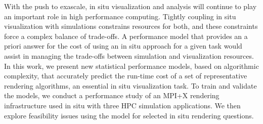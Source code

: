 \license


With the push to exascale, in situ visualization and analysis will continue to play an important role in high performance computing. Tightly coupling in situ visualization with simulations constrains resources for both, and these constraints force a complex balance of trade-offs. A performance model that provides an a priori answer for the cost of using an in situ approach for a given task would assist in managing the trade-offs between simulation and visualization resources. In this work, we present new statistical performance models, based on algorithmic complexity, that accurately predict the run-time cost of a set of representative rendering algorithms, an essential in situ visualization task. To train and validate the models, we conduct a performance study of an MPI+X rendering infrastructure used in situ with three HPC simulation applications. We then explore feasibility issues using the model for selected in situ rendering questions.

